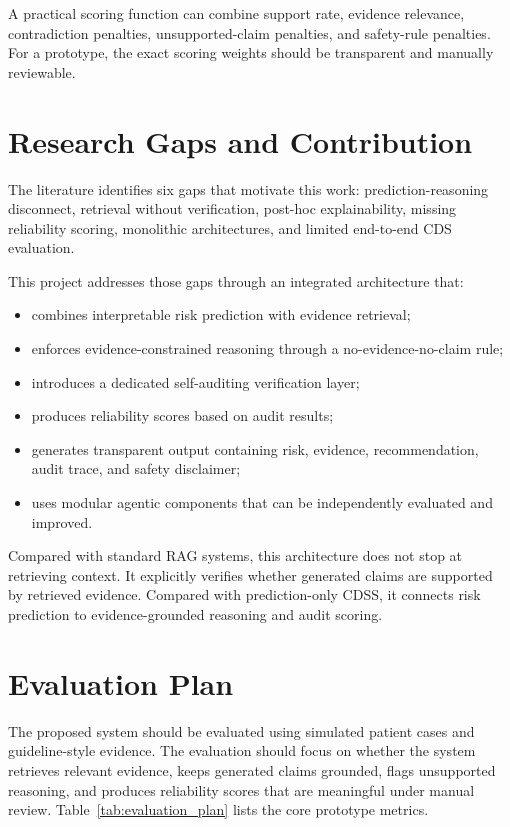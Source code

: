 \documentclass[conference]{IEEEtran}
\begin{document}
A practical scoring function can combine support rate, evidence relevance, contradiction penalties, unsupported-claim penalties, and safety-rule penalties. For a prototype, the exact scoring weights should be transparent and manually reviewable.

\section{Research Gaps and Contribution}
The literature identifies six gaps that motivate this work: prediction-reasoning disconnect, retrieval without verification, post-hoc explainability, missing reliability scoring, monolithic architectures, and limited end-to-end CDS evaluation.

This project addresses those gaps through an integrated architecture that:
\begin{itemize}
    \item combines interpretable risk prediction with evidence retrieval;
    \item enforces evidence-constrained reasoning through a no-evidence-no-claim rule;
    \item introduces a dedicated self-auditing verification layer;
    \item produces reliability scores based on audit results;
    \item generates transparent output containing risk, evidence, recommendation, audit trace, and safety disclaimer;
    \item uses modular agentic components that can be independently evaluated and improved.
\end{itemize}

Compared with standard RAG systems, this architecture does not stop at retrieving context. It explicitly verifies whether generated claims are supported by retrieved evidence. Compared with prediction-only CDSS, it connects risk prediction to evidence-grounded reasoning and audit scoring.

\section{Evaluation Plan}
The proposed system should be evaluated using simulated patient cases and guideline-style evidence. The evaluation should focus on whether the system retrieves relevant evidence, keeps generated claims grounded, flags unsupported reasoning, and produces reliability scores that are meaningful under manual review. Table~\ref{tab:evaluation_plan} lists the core prototype metrics.
\end{document}
